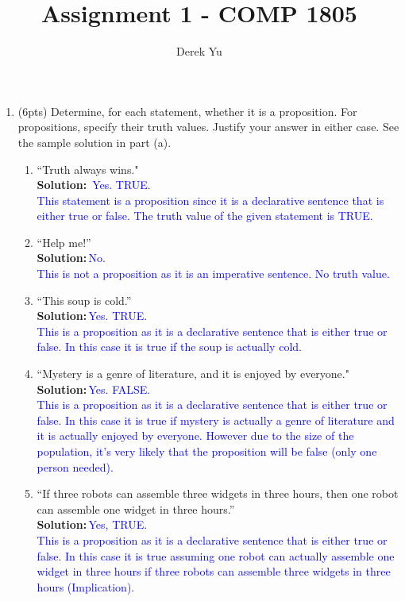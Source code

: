 \documentclass{article}
\author{Derek Yu}
\newcommand{\sol}[1]{\textbf{Solution:\,}\textcolor{blue}{#1}}
\begin{document}

\title{Assignment 1 - COMP 1805}
\maketitle
\thispagestyle{fancy}






\medskip
\begin{enumerate}
\item(6pts) Determine, for each statement, whether it is a proposition. For propositions, specify their truth values. Justify your answer in either case. See the sample solution in part (a).
\begin{enumerate}
\item ``Truth always wins." \\ 
\sol{
Yes. TRUE.\\
This statement is a proposition since it is a declarative sentence that is either true or false. The truth value of the given statement is TRUE.}
\item ``Help me!'' 
\\\sol{No. \\This is not a proposition as it is an imperative sentence. No truth value.}
\item ``This soup is cold.'' 
\\\sol{Yes. TRUE.\\This is a proposition as it is a declarative sentence that is either true or false. In this case it is true if the soup is actually cold.}
\item ``Mystery is a genre of literature, and it is enjoyed by everyone." 
\\\sol{Yes. FALSE. \\ This is a proposition as it is a declarative sentence that is either true or false. In this case it is true if mystery is actually a genre of literature and it is actually enjoyed by everyone. However due to the size of the population, it's very likely that the proposition will be false (only one person needed).}
\item ``If three robots can assemble three widgets in three hours, then one robot can assemble one widget in three hours.'' 
\\\sol{Yes, TRUE. \\This is a proposition as it is a declarative sentence that is either true or false. In this case it is true assuming one robot can actually assemble one widget in three hours if three robots can assemble three widgets in three hours (Implication).}
\end{enumerate}


\end{enumerate}
\end{document}
